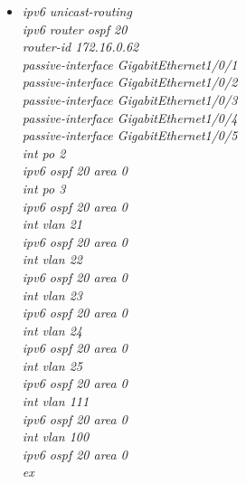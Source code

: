 \documentclass[a4paper, 12pt]{article}
\begin{document}
\begin{itemize}
\begin{itemize}
        \begin{itemize}
         \item \textit{ipv6 unicast-routing\\
                        ipv6 router ospf 20\\
                        router-id 172.16.0.62\\
                         passive-interface GigabitEthernet1/0/1\\
                         passive-interface GigabitEthernet1/0/2\\
                         passive-interface GigabitEthernet1/0/3\\
                         passive-interface GigabitEthernet1/0/4\\
                         passive-interface GigabitEthernet1/0/5\\
                        int po 2\\
                        ipv6 ospf 20 area 0\\
                        int po 3\\
                        ipv6 ospf 20 area 0\\
                        int vlan 21\\
                        ipv6 ospf 20 area 0\\
                        int vlan 22\\
                        ipv6 ospf 20 area 0\\
                        int vlan 23\\
                        ipv6 ospf 20 area 0\\
                        int vlan 24\\
                        ipv6 ospf 20 area 0\\
                        int vlan 25\\
                        ipv6 ospf 20 area 0\\
                        int vlan 111\\
                        ipv6 ospf 20 area 0\\
                        int vlan 100\\
                        ipv6 ospf 20 area 0\\
                        ex\\}
        
          \end{itemize}
       \end{itemize}
      
\end{itemize}
\end{document}
